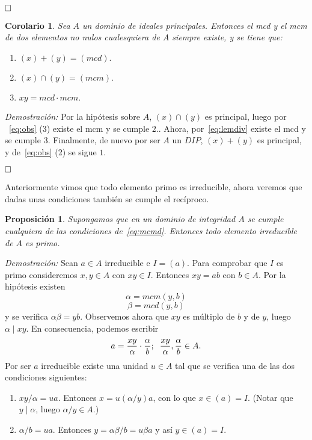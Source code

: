 \documentclass[12pt]{article}
\newtheorem{proposition}[theorem]{Proposición}
\newtheorem{corolario}{Corolario}[theorem]
\begin{document}
$\hfill \square$

\begin{corolario} Sea $A$ un dominio de ideales principales. Entonces el mcd y el mcm de dos elementos no nulos cualesquiera de $A$ siempre existe, y se tiene que: \begin{enumerate}
\item $(x) + (y) = (mcd).$
\item $(x) \cap (y) = (mcm).$
\item $xy = mcd \cdot mcm.$
\end{enumerate}
\end{corolario}
\emph{Demostración: }Por la hipótesis sobre $A$, $(x) \cap (y)$ es principal, luego por ~\ref{eq:obs} (3) existe el mcm y se cumple $2.$. Ahora, por~\ref{eq:lemdiv} existe el mcd y se cumple $3.$ Finalmente, de nuevo por ser $A$ un $DIP$, $(x) + (y)$ es principal, y de~\ref{eq:obs} (2) se sigue $1.$

$\hfill \square$

Anteriormente vimos que todo elemento primo es irreducible, ahora veremos que dadas unas condiciones también se cumple el recíproco.

\begin{proposition}\label{pregauss0} Supongamos que en un dominio de integridad $A$ se cumple cualquiera de las condiciones de~\ref{eq:mcmd}. Entonces todo elemento irreducible de $A$ es primo.
\end{proposition}
\emph{Demostración: } Sean $a \in A$ irreducible e $I = (a)$. Para comprobar que $I$ es primo consideremos $x,y \in A$ con $xy \in I$. Entonces $xy = ab$ con $b \in A$. Por la hipótesis existen $$\alpha = mcm (y,b)$$ $$\beta = mcd(y,b)$$ y se verifica $\alpha \beta = yb.$ Observemos ahora que $xy$ es múltiplo de $b$ y de $y$, luego $\alpha \mid xy$. En consecuencia, podemos escribir $$a = \frac{xy}{\alpha} \cdot \frac{\alpha}{b}; \hspace{0.2cm} \frac{xy}{\alpha}, \frac{\alpha}{b} \in A.$$ Por ser $a$ irreducible existe una unidad $u \in A$ tal que se verifica una de las dos condiciones siguientes: \begin{enumerate}
\item $xy/\alpha = ua$. Entonces $x = u(\alpha/y)a$, con lo que $x \in (a) = I$. (Notar que $y \mid \alpha$, luego $\alpha /y \in A$.)
\item $\alpha/b = ua$. Entonces $y = \alpha \beta /b = u \beta a$ y así $y \in (a) = I$.
\end{enumerate}
\end{document}
